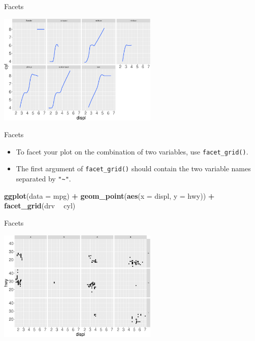 \documentclass[ignorenonframetext,]{beamer}
\newenvironment{Shaded}{\begin{snugshade}}{\end{snugshade}}
\newcommand{\DataTypeTok}[1]{\textcolor[rgb]{0.13,0.29,0.53}{#1}}
\newcommand{\KeywordTok}[1]{\textcolor[rgb]{0.13,0.29,0.53}{\textbf{#1}}}
\newcommand{\NormalTok}[1]{#1}
\newcommand{\OperatorTok}[1]{\textcolor[rgb]{0.81,0.36,0.00}{\textbf{#1}}}
\newcommand{\StringTok}[1]{\textcolor[rgb]{0.31,0.60,0.02}{#1}}
\begin{document}
\begin{frame}{Facets}
\protect\hypertarget{facets-4}{}

\begin{center}\includegraphics[height=200px]{data-visualization_files/figure-beamer/unnamed-chunk-73-1} \end{center}

\end{frame}

\begin{frame}[fragile]{Facets}
\protect\hypertarget{facets-5}{}

\begin{itemize}
\item
  To facet your plot on the combination of two variables, use
  \texttt{facet\_grid()}.
\item
  The first argument of \texttt{facet\_grid()} should contain the two
  variable names separated by \texttt{"\textasciitilde{}"}.
\end{itemize}

\begin{Shaded}
\begin{Highlighting}[]
\KeywordTok{ggplot}\NormalTok{(}\DataTypeTok{data =}\NormalTok{ mpg) }\OperatorTok{+}\StringTok{ }
\StringTok{  }\KeywordTok{geom_point}\NormalTok{(}\KeywordTok{aes}\NormalTok{(}\DataTypeTok{x =}\NormalTok{ displ, }\DataTypeTok{y =}\NormalTok{ hwy)) }\OperatorTok{+}\StringTok{ }
\StringTok{  }\KeywordTok{facet_grid}\NormalTok{(drv }\OperatorTok{~}\StringTok{ }\NormalTok{cyl)}
\end{Highlighting}
\end{Shaded}

\end{frame}

\begin{frame}{Facets}
\protect\hypertarget{facets-6}{}

\begin{center}\includegraphics[height=200px]{data-visualization_files/figure-beamer/unnamed-chunk-75-1} \end{center}

\end{frame}
\end{document}

